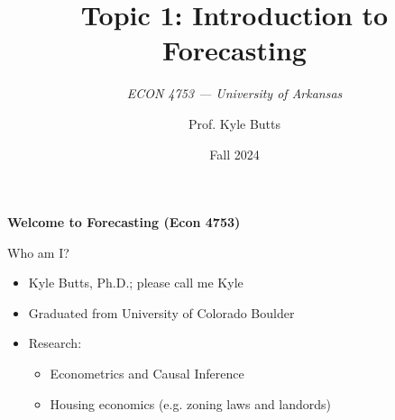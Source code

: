 \documentclass[aspectratio=169,t,11pt,table]{beamer}
\title{Topic 1: Introduction to Forecasting}
\subtitle{\it  ECON 4753 — University of Arkansas}
\date{Fall 2024}
\author{Prof. Kyle Butts}
\begin{document}
\begin{frame}
\maketitle

\end{frame}

\begin{frame}{}
  \bigskip\bigskip
  \begin{center}
    \alert{\LARGE\bf Welcome to Forecasting (Econ 4753)}
  \end{center}

  \bigskip\bigskip
  Who am I?
  \begin{itemize}
    \item Kyle Butts, Ph.D.; please call me Kyle
    
    \item Graduated from University of Colorado Boulder
    
    \item Research: 
    \begin{itemize}
      \item Econometrics and Causal Inference
      \item Housing economics (e.g. zoning laws and landords)
    \end{itemize}
  \end{itemize}
\end{frame}
\end{document}
